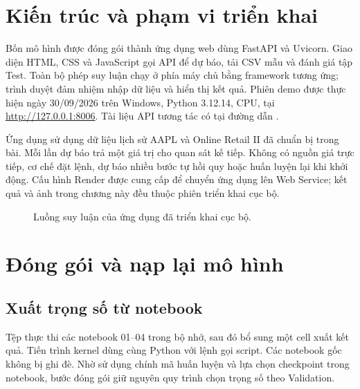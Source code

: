 \documentclass[12pt,a4paper]{report}
\begin{document}
\section{Kiến trúc và phạm vi triển khai}
Bốn mô hình được đóng gói thành ứng dụng web dùng FastAPI và Uvicorn. Giao diện HTML, CSS và JavaScript gọi API để dự báo, tải CSV mẫu và đánh giá tập Test. Toàn bộ phép suy luận chạy ở phía máy chủ bằng framework tương ứng; trình duyệt đảm nhiệm nhập dữ liệu và hiển thị kết quả. Phiên demo được thực hiện ngày 30/09/2026 trên Windows, Python 3.12.14, CPU, tại \url{http://127.0.0.1:8006}. Tài liệu API tương tác có tại đường dẫn .

Ứng dụng sử dụng dữ liệu lịch sử AAPL và Online Retail II đã chuẩn bị trong bài. Mỗi lần dự báo trả một giá trị cho quan sát kế tiếp. Không có nguồn giá trực tiếp, cơ chế đặt lệnh, dự báo nhiều bước tự hồi quy hoặc huấn luyện lại khi khởi động. Cấu hình Render được cung cấp để chuyển ứng dụng lên Web Service; kết quả và ảnh trong chương này đều thuộc phiên triển khai cục bộ.

\begin{figure}[H]\centering
{}
\caption{Luồng suy luận của ứng dụng đã triển khai cục bộ.}\label{fig:deploy-flow}
\end{figure}

\section{Đóng gói và nạp lại mô hình}
\subsection{Xuất trọng số từ notebook}
Tệp  thực thi các notebook 01--04 trong bộ nhớ, sau đó bổ sung một cell xuất kết quả. Tiến trình kernel dùng cùng Python với lệnh gọi script. Các notebook gốc không bị ghi đè. Nhờ sử dụng chính mã huấn luyện và lựa chọn checkpoint trong notebook, bước đóng gói giữ nguyên quy trình chọn trọng số theo Validation.
\end{document}
